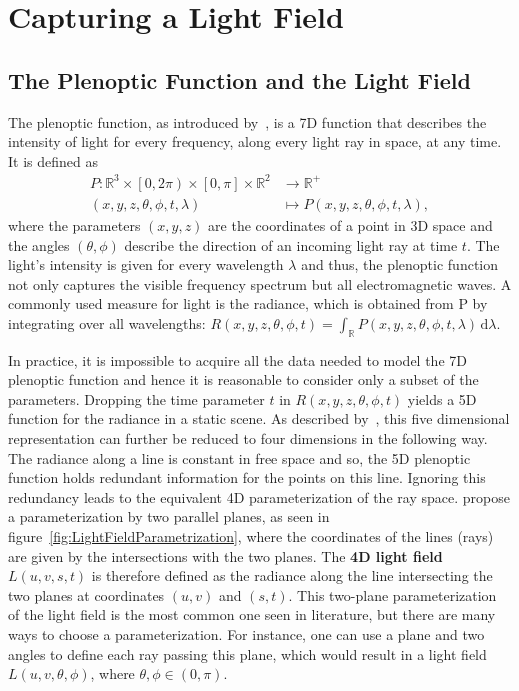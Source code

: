 \chapter{Capturing a Light Field}
\label{chp:light_field_capturing}


\section{The Plenoptic Function and the Light Field}

The plenoptic function, as introduced by~\cite{AdelsonBergen}, is a 7D function that describes the intensity of light for every frequency, along every light ray in space, at any time. 
It is defined as
\begin{align*}
	P \colon \mathbb{R}^3 \times \left[0, 2 \pi \right) \times \left[ 0, \pi \right] \times \mathbb{R}^2 & \to \mathbb{R}^+ \\
	\left(x, y, z, \theta, \phi, t, \lambda \right) & \mapsto P\left(x, y, z, \theta, \phi, t, \lambda \right), 
\end{align*}
where the parameters $\left(x, y, z\right)$ are the coordinates of a point in 3D space and the angles $\left(\theta, \phi \right)$ describe the direction of an incoming light ray at time $t$. 
The light's intensity is given for every wavelength $\lambda$ and thus, the plenoptic function not only captures the visible frequency spectrum but all electromagnetic waves. 
A commonly used measure for light is the radiance, which is obtained from P by integrating over all wavelengths: 
$R\left(x, y, z, \theta, \phi, t\right) = \int_{\mathbb{R}} \! P\left(x, y, z, \theta, \phi, t, \lambda \right) \, \mathrm{d} \lambda$.

In practice, it is impossible to acquire all the data needed to model the 7D plenoptic function and hence it is reasonable to consider only a subset of the parameters. 
Dropping the time parameter $t$ in $R\left( x, y, z, \theta, \phi, t \right) $ yields a 5D function for the radiance in a static scene. 
As described by~\cite{LightFieldRendering}, this five dimensional representation can further be reduced to four dimensions in the following way. 
The radiance along a line is constant in free space and so, the 5D plenoptic function holds redundant information for the points on this line. 
Ignoring this redundancy leads to the equivalent 4D parameterization of the ray space. 
\cite{LightFieldRendering} propose a parameterization by two parallel planes, as seen in figure~\ref{fig:LightFieldParametrization}, where the coordinates of the lines (rays) are given by the intersections with the two planes.
The \textbf{4D light field} $L(u, v, s, t)$ is therefore defined as the radiance along the line intersecting the two planes at coordinates $(u, v)$ and $(s, t)$.
This two-plane parameterization of the light field is the most common one seen in literature, but there are many ways to choose a parameterization.
For instance, one can use a plane and two angles to define each ray passing this plane, which would result in a light field $L(u, v, \theta, \phi)$, where $\theta, \phi \in (0, \pi)$.

